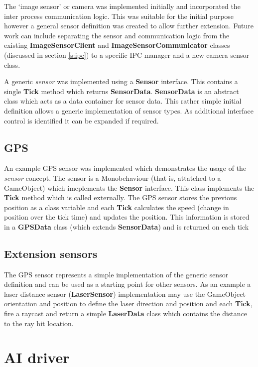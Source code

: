 \documentclass{article}
\begin{document}
The `image sensor' or camera was implemented initially and incorporated the inter process communication logic. This was suitable for the initial purpose however a general sensor definition was created to allow further extension. Future work can include separating the sensor and communication logic from the existing \textbf{ImageSensorClient} and \textbf{ImageSensorCommunicator} classes (discussed in section \ref{s:ipc}) to a specific IPC manager and a new camera sensor class.

A generic \textit{sensor} was implemented using a \textbf{Sensor} interface. This contains a single \textbf{Tick} method which returns \textbf{SensorData}. \textbf{SensorData} is an abstract class which acts as a data container for sensor data. This rather simple initial definition allows a generic implementation of sensor types. As additional interface control is identified it can be expanded if required. 

\subsection{GPS}

An example GPS sensor was implemented which demonstrates the usage of the \textit{sensor} concept. The sensor is a Monobehaviour (that is, attatched to a GameObject) which imeplements the \textbf{Sensor} interface. This class implements the \textbf{Tick} method which is called externally. The GPS sensor stores the previous position as a class variable and each \textbf{Tick} calculates the speed (change in position over the tick time) and updates the position. This information is stored in a \textbf{GPSData} class (which extends \textbf{SensorData}) and is returned on each tick

\subsection{Extension sensors}

The GPS sensor represents a simple implementation of the generic sensor definition and can be used as a starting point for other sensors. As an example a laser distance sensor (\textbf{LaserSensor}) implementation may use the GameObject orientation and position to define the laser direction and position and each \textbf{Tick}, fire a raycast and return a simple \textbf{LaserData} class which contains the distance to the ray hit location.


\section{AI driver}
\end{document}
